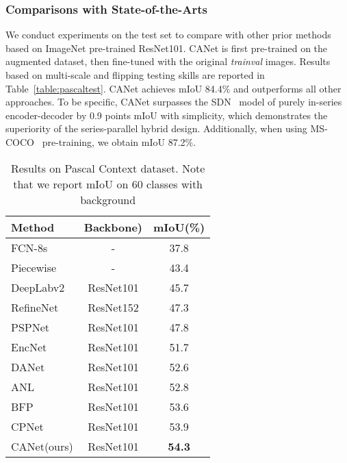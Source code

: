 \documentclass[journal]{IEEEtran}
\begin{document}
\subsubsection{Comparisons with State-of-the-Arts}
We conduct experiments on the test set to compare with other prior methods based on ImageNet pre-trained ResNet101. CANet is first pre-trained on the augmented dataset, then fine-tuned with the original \emph{trainval} images. Results based on multi-scale and flipping testing skills are reported in Table~\ref{table:pascaltest}. CANet achieves mIoU 84.4\% and outperforms all other approaches. To be specific, CANet surpasses the SDN~\cite{fu2019stacked} model of purely in-series encoder-decoder by 0.9 points mIoU with simplicity, which demonstrates the superiority of the series-parallel hybrid design. Additionally, when using MS-COCO~\cite{lin2014microsoft} pre-training, we obtain mIoU 87.2\%.

\begin{table}
\caption{Results on Pascal Context dataset. Note that we report mIoU on 60 classes with background}
\begin{center}
    \begin{tabular}{lc|c}
    \toprule
        \textbf{Method} & \textbf{Backbone)} & \textbf{mIoU(\%)} \\
    \midrule\midrule
        FCN-8s~\cite{long2015fully} & - & 37.8 \\
        Piecewise~\cite{lin2016efficient} & - & 43.4 \\
        DeepLabv2~\cite{chen2017deeplab} & ResNet101 & 45.7 \\
        RefineNet~\cite{lin2017refinenet} & ResNet152 & 47.3 \\
        PSPNet~\cite{zhao2017pyramid} & ResNet101 & 47.8 \\
        EncNet~\cite{zhang2018context} & ResNet101 & 51.7 \\
        DANet~\cite{fu2019dual} & ResNet101 & 52.6 \\
        ANL~\cite{zhu2019asymmetric} & ResNet101 & 52.8 \\
        BFP~\cite{ding2019boundary} & ResNet101 & 53.6 \\
        CPNet~\cite{yu2020context} & ResNet101 & 53.9 \\
    \midrule
        CANet(ours) & ResNet101 & \textbf{54.3} \\
    \bottomrule
    \end{tabular}
\end{center}
\label{table:pcontext}
\end{table}
\end{document}
